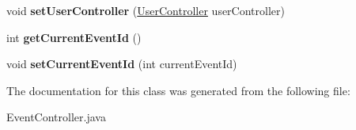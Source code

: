 \begin{DoxyCompactItemize}
\item 
\hypertarget{classch_1_1bbc_1_1partyplanner_1_1controller_1_1_event_controller_a99ee5c29f22bc5bdce54d8a4728652e8}{}\label{classch_1_1bbc_1_1partyplanner_1_1controller_1_1_event_controller_a99ee5c29f22bc5bdce54d8a4728652e8} 
void {\bfseries set\+User\+Controller} (\hyperlink{classch_1_1bbc_1_1partyplanner_1_1controller_1_1_user_controller}{User\+Controller} user\+Controller)
\item 
\hypertarget{classch_1_1bbc_1_1partyplanner_1_1controller_1_1_event_controller_abacda5c9bf09877a6ea39a012316b362}{}\label{classch_1_1bbc_1_1partyplanner_1_1controller_1_1_event_controller_abacda5c9bf09877a6ea39a012316b362} 
int {\bfseries get\+Current\+Event\+Id} ()
\item 
\hypertarget{classch_1_1bbc_1_1partyplanner_1_1controller_1_1_event_controller_aa0a2431cd4dafe295f6340b719aacd38}{}\label{classch_1_1bbc_1_1partyplanner_1_1controller_1_1_event_controller_aa0a2431cd4dafe295f6340b719aacd38} 
void {\bfseries set\+Current\+Event\+Id} (int current\+Event\+Id)
\end{DoxyCompactItemize}


The documentation for this class was generated from the following file\+:\begin{DoxyCompactItemize}
\item 
Event\+Controller.\+java\end{DoxyCompactItemize}
